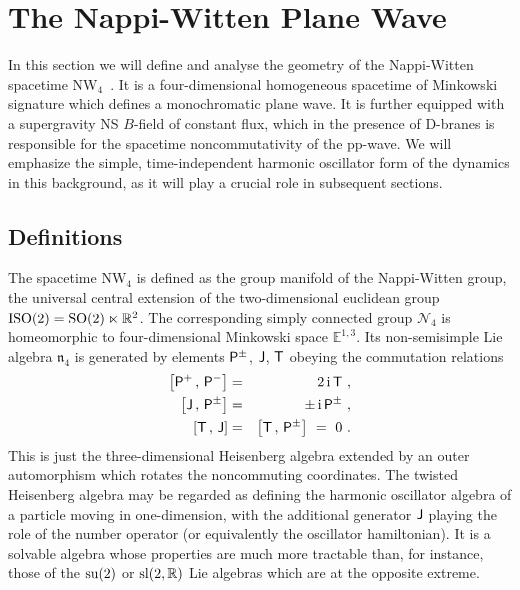 \documentclass[11pt,a4paper]{article}
\newcommand{\ii}{{\rm i}}
\def\ii{{\,{\rm i}\,}}
\def\P{{\sf P}}
\def\T{{\sf T}}
\def\J{{\sf J}}
\newcommand{\newsection}{\setcounter{equation}{0}\section}
\newcommand{\real}{{\mathbb R}} %
\newcommand{\eucl}{{\mathbb E}}
\def\nn{\nonumber}
\def\bea{\begin{eqnarray}}
\def\eea{\end{eqnarray}}
\begin{document}
\newsection{The Nappi-Witten Plane Wave \label{NWPW}}

In this section we will define and analyse the geometry of the
Nappi-Witten spacetime NW$_4$~\cite{NW1}. It is a four-dimensional
homogeneous spacetime of Minkowski signature which defines
a monochromatic plane wave. It is further equipped with a supergravity
NS $B$-field of constant flux, which in the presence of D-branes is
responsible for the spacetime noncommutativity of the
pp-wave. We will emphasize the simple, time-independent harmonic
oscillator form of the dynamics in this background, as it will play a
crucial role in subsequent sections.

\subsection{Definitions \label{Defs}}

The spacetime NW$_4$ is defined as the group manifold of
the Nappi-Witten group, the universal central extension of the
two-dimensional euclidean group ${\rm ISO}(2)={\rm
  SO}(2)\ltimes\real^2$. The corresponding simply connected group
$\mathcal N_4$ is homeomorphic to four-dimensional Minkowski space
$\eucl^{1,3}$. Its non-semisimple Lie algebra $\mathfrak n_4$ is
generated by elements $\P^\pm$, $\J$, $\T$ obeying the commutation
relations
\bea
\left[\P^+\,,\,\P^-\right]&=&2\ii\T \ , \nn\\
\left[\J\,,\,\P^\pm\right]&=&\pm\ii\P^\pm \ , \nn\\
\left[\T\,,\,\J\right]&=&\left[\T\,,\,\P^\pm\right]~=~0 \ .
\label{NW4algdef}\eea
This is just the three-dimensional Heisenberg algebra extended by an
outer automorphism which rotates the noncommuting coordinates. The
twisted Heisenberg algebra
may be regarded as defining the harmonic oscillator algebra of a
particle moving in one-dimension, with the additional generator $\J$
playing the role of the number operator (or equivalently the
oscillator hamiltonian). It is a solvable algebra whose properties are
much more tractable than, for instance, those of the
${\rm su}(2)$ or ${\rm sl}(2,\real)$ Lie algebras which are
at the opposite extreme.
\end{document}
